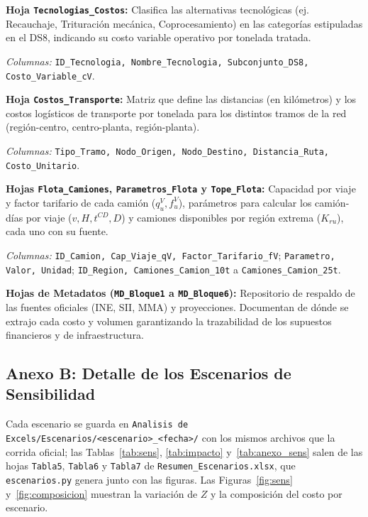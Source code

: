 \documentclass[letterpaper]{article}
\begin{document}
\textbf{Hoja \texttt{Tecnologias\_\allowbreak Costos}:} Clasifica las alternativas tecnológicas (ej. Recauchaje, Trituración mecánica, Coprocesamiento) en las categorías estipuladas en el DS8, indicando su costo variable operativo por tonelada tratada.\\
{\raggedright \textit{Columnas:} \texttt{ID\_\allowbreak Tecnologia, Nombre\_\allowbreak Tecnologia, Subconjunto\_\allowbreak DS8, Costo\_\allowbreak Variable\_\allowbreak cV}.\par}

\textbf{Hoja \texttt{Costos\_\allowbreak Transporte}:} Matriz que define las distancias (en kilómetros) y los costos logísticos de transporte por tonelada para los distintos tramos de la red (región-centro, centro-planta, región-planta).\\
{\raggedright \textit{Columnas:} \texttt{Tipo\_\allowbreak Tramo, Nodo\_\allowbreak Origen, Nodo\_\allowbreak Destino, Distancia\_\allowbreak Ruta, Costo\_\allowbreak Unitario}.\par}

\textbf{Hojas \texttt{Flota\_\allowbreak Camiones}, \texttt{Parametros\_\allowbreak Flota} y \texttt{Tope\_\allowbreak Flota}:} Capacidad por viaje y factor tarifario de cada camión ($q^V_u, f^V_u$), parámetros para calcular los camión-días por viaje ($v, H, t^{CD}, D$) y camiones disponibles por región extrema ($K_{ru}$), cada uno con su fuente.\\
{\raggedright \textit{Columnas:} \texttt{ID\_\allowbreak Camion, Cap\_\allowbreak Viaje\_\allowbreak qV, Factor\_\allowbreak Tarifario\_\allowbreak fV}; \texttt{Parametro, Valor, Unidad}; \texttt{ID\_\allowbreak Region, Camiones\_\allowbreak Camion\_\allowbreak 10t} a \texttt{Camiones\_\allowbreak Camion\_\allowbreak 25t}.\par}

\textbf{Hojas de Metadatos (\texttt{MD\_\allowbreak Bloque1} a \texttt{MD\_\allowbreak Bloque6}):} Repositorio de respaldo de las fuentes oficiales (INE, SII, MMA) y proyecciones. Documentan de dónde se extrajo cada costo y volumen garantizando la trazabilidad de los supuestos financieros y de infraestructura.



\subsection*{Anexo B: Detalle de los Escenarios de Sensibilidad}
Cada escenario se guarda en \texttt{Analisis de Excels/Escenarios/<escenario>\_<fecha>/} con los mismos archivos que la corrida oficial; las Tablas~\ref{tab:sens}, \ref{tab:impacto} y~\ref{tab:anexo_sens} salen de las hojas \texttt{Tabla5}, \texttt{Tabla6} y \texttt{Tabla7} de \texttt{Resumen\_Escenarios.xlsx}, que \texttt{escenarios.py} genera junto con las figuras. Las Figuras~\ref{fig:sens} y~\ref{fig:composicion} muestran la variación de $Z$ y la composición del costo por escenario.
\end{document}
